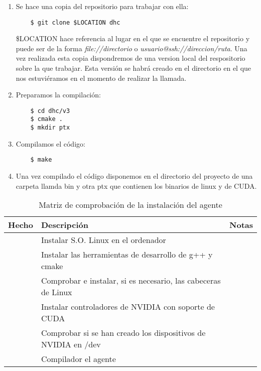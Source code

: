 \begin{enumerate}
	\item Se hace una copia del repositorio para trabajar con ella:
	
	\begin{verbatim}
	$ git clone $LOCATION dhc
	\end{verbatim}
	
	\$LOCATION hace referencia al lugar en el que se encuentre el repositorio y puede ser de la forma \emph{file://directorio} o \emph{usuario@ssh://direccion/ruta}. Una vez realizada esta copia dispondremos de una version local del respositorio sobre la que trabajar. Esta versión se habrá creado en el directorio en el que nos estuviéramos en el momento de realizar la llamada.
	
	\item Preparamos la compilación:
	
	\begin{verbatim}
	$ cd dhc/v3
	$ cmake .
	$ mkdir ptx
	\end{verbatim}
	
	\item Compilamos el código:
	
	\begin{verbatim}
	$ make
	\end{verbatim}
	
	\item Una vez compilado el código disponemos en el directorio del proyecto de una carpeta llamda bin y otra ptx que contienen los binarios de linux y de CUDA.
\end{enumerate}

\begin{table}
	\centering
	
	\begin{tabular}{|c|p{5.6cm}|p{5.6cm}|}
	\hline
	Hecho & Descripción & Notas\\
	\hline
	& Instalar S.O. Linux en el ordenador & \\
	\hline
	& Instalar las herramientas de desarrollo de g++ y cmake & \\
	\hline
	& Comprobar e instalar, si es necesario, las cabeceras de Linux & \\
	\hline
	& Instalar controladores de NVIDIA con soporte de CUDA & \\
	\hline
	& Comprobar si se han creado los dispositivos de NVIDIA en /dev & \\
	\hline
	& Compilador el agente & \\
	\hline
	\end{tabular}
	
	\caption{Matriz de comprobación de la instalación del agente}\label{tab:mat_agente}
\end{table}


